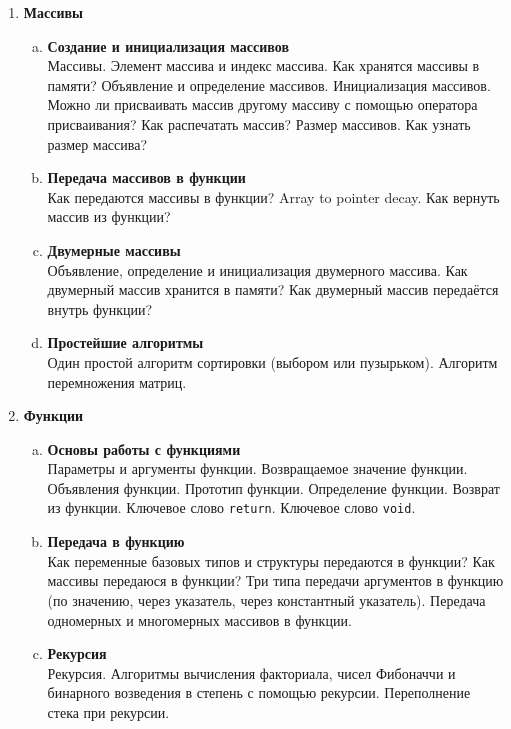 \documentclass{article}
\begin{document}
\begin{enumerate}
\item \textbf{Массивы}\\


\begin{enumerate}[a.]
\item \textbf{Создание и инициализация массивов}\\
Массивы. Элемент массива и индекс массива. Как хранятся массивы в памяти? Объявление и определение массивов. Инициализация массивов. Можно ли присваивать массив другому массиву с помощью оператора присваивания? Как распечатать массив? Размер массивов. Как узнать размер массива?

\item \textbf{Передача массивов в функции}\\
Как передаются массивы в функции? Array to pointer decay. Как вернуть массив из функции?

\item \textbf{Двумерные массивы}\\
Объявление, определение и инициализация двумерного массива. Как двумерный массив хранится в памяти? Как двумерный массив передаётся внутрь функции?

\item \textbf{Простейшие алгоритмы}\\
Один простой алгоритм сортировки (выбором или пузырьком). Алгоритм перемножения матриц. 
\end{enumerate}


\item \textbf{Функции}\\

\begin{enumerate}[a.]
\item \textbf{Основы работы с функциями}\\
Параметры и аргументы функции. Возвращаемое значение функции. Объявления функции. Прототип функции. Определение функции.
Возврат из функции. Ключевое слово \texttt{return}. Ключевое слово \texttt{void}.

\item \textbf{Передача в функцию}\\
Как переменные базовых типов и структуры передаются в функции? Как массивы передаюся в функции? Три типа передачи аргументов в функцию (по значению, через указатель, через константный указатель). Передача одномерных и многомерных массивов в функции.

\item \textbf{Рекурсия}\\
Рекурсия. Алгоритмы вычисления факториала, чисел Фибоначчи и бинарного возведения в степень с помощью рекурсии.
Переполнение стека при рекурсии.
\end{enumerate}


\end{enumerate}
\end{document}
